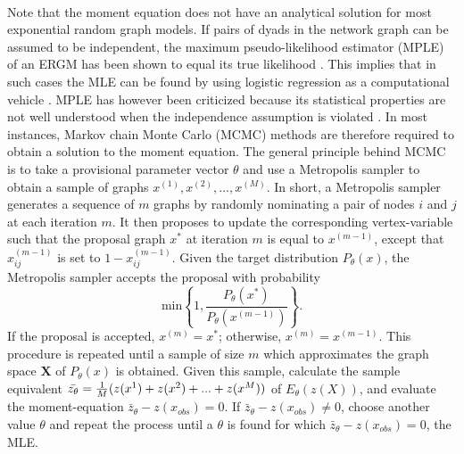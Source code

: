 \documentclass[a4paper, man]{apa6}
\begin{document}
\\
Note that the moment equation does not have an analytical solution for most exponential random graph models. If pairs of dyads in the network graph can be assumed to be independent, the maximum pseudo-likelihood estimator (MPLE) of an ERGM has been shown to equal its true likelihood \cite{hunter2008ergm}. This implies that in such cases the MLE can be found by using logistic regression as a computational vehicle \cite{hunter2008ergm}. MPLE has however been criticized because its statistical properties are not well understood when the independence assumption is violated \cite{van2009framework}. In most instances, Markov chain Monte Carlo (MCMC) methods are therefore required to obtain a solution to the moment equation. The general principle behind MCMC is to take a provisional parameter vector $\theta$ and use a Metropolis sampler to obtain a sample of graphs $x^{(1)}, x^{(2)}, ..., x^{(M)}$. In short, a Metropolis sampler generates a sequence of $m$ graphs by randomly nominating a pair of nodes $i$ and $j$ at each iteration $m$. It then proposes to update the corresponding vertex-variable such that the proposal graph $x^{*}$ at iteration $m$ is equal to $x^{(m−1)}$, except that $x_{ij}^{(m-1)}$ is set to $1 − x_{ij}^{(m−1)}$. Given the target distribution $P_{\theta}(x)$, the Metropolis sampler accepts the proposal with probability \begin{equation} \text{min} \left\{1, \frac{P_{\theta}(x^{*})}{P_{\theta}(x^{(m-1)})} \right\}. \end{equation} If the proposal is accepted, $x^{(m)} = x^{*}$; otherwise, $x^{(m)} = x^{(m−1)}$. This procedure is repeated until a sample of size $m$ which approximates the graph space $\textbf{X}$ of $P_{\theta}(x)$ is obtained. Given this sample, calculate the sample equivalent $\bar{z_{\theta}} = \frac{1}{M}(z(x^{1}) + z(x^{2}) + \\ \noindent ... + z(x^{M}))$ of $E_{\theta}(z(X))$, and evaluate the moment-equation $\bar{z}_{\theta} − z(x_{obs}) = 0$. If $\bar{z}_{\theta} − z(x_{obs}) \neq 0$, choose another value $\theta$ and repeat the process until a $\theta$ is found for which $\bar{z}_{\theta} − z(x_{obs}) = 0$, the MLE. 
\\
\end{document}
